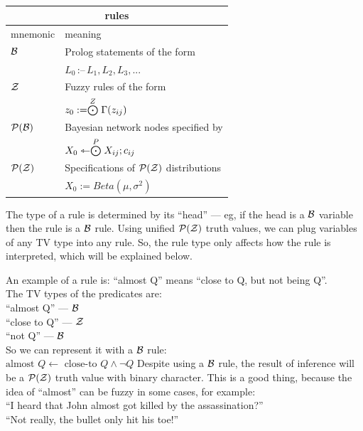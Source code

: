 \begin{table}[H]
\parbox{3cm}{\caption{}}
\begin{tabular}{|l|l|} \hline
\multicolumn{2}{|c|}{\textbf{rules}}\\ \hline
mnemonic             & meaning\\ \hline
$\mathcal{B}$              & Prolog statements of the form\\
                     & \qquad $L_0 \, \mbox{:--} \, L_1, L_2, L_3, ... $ \\
$\mathcal{Z}$              & Fuzzy rules of the form\\
                     & \qquad $z_0 := \stackrel{Z}{\bigodot} \Gamma(z_{ij})$ \\
$\mathcal{P(B)}$             & Bayesian network nodes specified by\\
                     & \qquad $X_0 \leftarrowtriangle \stackrel{P}{\bigodot} X_{ij};c_{ij}$ \\
$\mathcal{P(Z)}$             & Specifications of $\mathcal{P(Z)}$ distributions\\
                     & \qquad $X_0 := Beta(\mu,\sigma^2)$ \\
\hline
\end{tabular}
\end{table}

The type of a rule is determined by its ``head'' --- eg, if the head is a $\mathcal{B}$ variable then the rule is a $\mathcal{B}$ rule.  Using unified $\mathcal{P(Z)}$ truth values, we can plug variables of any TV type into any rule.  So, the rule type only affects how the rule is interpreted, which will be explained below.

An example of a rule is:  ``almost Q'' means ``close to Q, but not being Q''.\\
The TV types of the predicates are:\\
\hspace*{1cm} ``almost Q'' --- $\mathcal{B}$\\
\hspace*{1cm} ``close to Q'' --- $\mathcal{Z}$\\
\hspace*{1cm} ``not Q'' --- $\mathcal{B}$\\
So we can represent it with a $\mathcal{B}$ rule:\\
\hspace*{1cm} $\mbox{almost } Q \leftarrow \mbox{ close-to } Q \wedge \neg Q$
Despite using a $\mathcal{B}$ rule, the result of inference will be a $\mathcal{P(Z)}$ truth value with binary character.  This is a good thing, because the idea of ``almost'' can be fuzzy in some cases, for example:\\
\hspace*{1cm} ``I heard that John almost got killed by the assassination?''\\
\hspace*{1cm} ``Not really, the bullet only hit his toe!''

